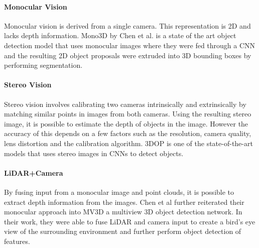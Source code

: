 \paragraph{Monocular Vision} 
Monocular vision is derived from a single camera. This representation is 2D and lacks depth information. Mono3D\cite{chen2016monocular} by Chen et al.  is a state of the art object detection model that uses monocular images where they were fed through a CNN and the resulting 2D object proposals were extruded into 3D bounding boxes by performing segmentation.

\paragraph{Stereo Vision}Stereo vision involves calibrating two cameras intrinsically and extrinsically by matching similar points in images from both cameras. Using the resulting stereo image, it is possible to estimate the depth of objects in the image. However the accuracy of this depends on a few factors such as the resolution, camera quality, lens distortion and the calibration algorithm. 3DOP \cite{chen20183d} is one of the state-of-the-art models that uses stereo images in CNNs to detect objects.  

\paragraph{LiDAR+Camera}
By fusing input from a monocular image and point clouds, it is possible to extract depth information from the images. Chen et al further reiterated their monocular approach into MV3D\cite{chen2017multi} a multiview 3D object detection network. In their work, they were able to fuse LiDAR and camera input to create a bird's eye view of the surrounding environment and further perform object detection of features. 


